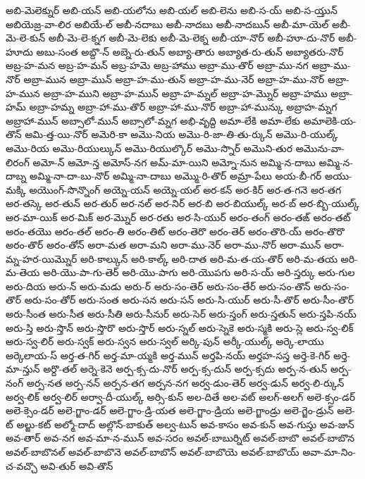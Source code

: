 {అబి-మెలెక్నుర్
అబి-యన్
అబి-యలోను
అబి-యల్
అబి-లెను
అబి-స-య్
అబి-స-య్తున్
అబియెజ్ర-వా-లిర
అబియే-ల్
అబీ-నదాబు
అబీ-నాదబు
అబీ-నాదబున్
అబీ-మా-యెల్
అబీ-మె-లె-కున్
అబీ-మె-లె-క్నగ
అబీ-మె-లెకు
అబీ-మె-లెక్న
అబీ-యా-నొర్
అబీ-హూ-దు-నొర్
అబీ-హూదు
అబు-సంత
అబ్దొ-న్
అబ్నె-రు-తున్
అబ్యా-తారు
అబ్యాత-రు-తున్
అబ్యాతరు-నొర్
అబ్ర-హ-మన
అబ్ర-హ-మన్
అబ్ర-హమె
అబ్ర-హాము
అబ్రా-ము-తొర్
అబ్రా-ము-నగ
అబ్రా-ము-నొర్
అబ్రా-మున
అబ్రా-మున్
అబ్రా-హ-ము-తున్
అబ్రా-హ-ము-నెర్
అబ్రా-హ-ము-నొర్
అబ్రా-హ-మున
అబ్రా-హ-ముని
అబ్రా-హ-మున్
అబ్రా-హ-మ్నల్
అబ్రా-హ-మ్నొర్
అబ్రా-హము
అబ్రా-హమ్
అబ్రా-హమ్న
అబ్రా-హా-ము-తొర్
అబ్రా-హా-ము-నొర్
అబ్రా-హా-మున్కు
అబ్రాహ-మ్నగ
అబ్రాహా-మున్
అబ్సాలో-మున్
అబ్సాలో-మ్నగ
అభి-వృద్ది
అమా-లేకి
అమా-లేకు
అమాలెకి-య-తొన్
అమి-త్త-యి-నొర్
అమెరి-కా
అమొ-నియ
అమొ-రి-జా-తి-తు-ర్కున్
అమొ-రి-యుల్క్
అమొ-రియ
అమొ-రియుల్కున్
అమొ-రియుల్కొర్
అమొ-స్నొర్
అమొని-తుర
అమొను-వా-లిరంగ్
అమో-న్
అమో-న్త
అమోస్-నగ
అమ్-మా-యిని
అమ్నో-నున
అమ్మి-న-దాబు
అమ్మి-న-దాబ్న
అమ్మి-నా-దా-బు-నొర్
అమ్మి-నా-దాబు
అమ్మొ-రి-తొర్
అమ్రా-పేలు
అయ-బీ-గర్
అయు-మక్కి
అయొంగ్-సొన్నొంగ్
అయ్నె-యన్
అయ్నె-యల్
అర-కన్
అర-కిర్
అర-త-గనె
అర-తగ
అర-తస్కె
అర-తున్
అర-తుర్
అర-నల్
అర-నిర్
అర-బి
అర-బియుల్క్
అర-బ్
అర-బ్బి-యుల్క్
అర-మా-యిక్
అర-మిక్
అర-మ్నొర్
అర-రతు
అర-సి-యుర్
అరం-తంగ్
అరం-తఙ్
అరం-తట్
అరం-తయొ
అరం-తల్
అరం-తి
అరం-తిట్
అరం-తెరొ
అరం-తెర్
అరం-తొరి-య్
అరం-తొరొ
అరం-తొర్
అరం-తోన్
అరా-మత
అరా-మని
అరా-ము-నెర్
అరా-ము-నొర్
అరా-మున్
అరా-మ్న-హర-యిమ్నొర్
అరి-కాల్కున్
అరి-కాల్క్
అరి-దాత
అరి-మ-త-య-తొర్
అరి-మ-తయ
అరి-మ-తెయ
అరి-యొ-పా-గు-తెర్
అరి-యొ-పాగు
అరి-యొపగు
అరి-స-య్
అరి-స్తర్కు
అరు-గుల
అరు-దియ
అరు-న్
అరు-మడు
అరు-ర్
అరు-సం-తెర్
అరు-సం-తేర్
అరు-సం-తొన్
అరు-సం-తొర్
అరు-సం-తోర్
అరు-సంత
అరు-సన
అరు-సన్
అరు-సి-యుర్
అరు-సీ-తొర్
అరు-సీం-తొర్
అరు-సీంత
అరు-సీత
అరు-సీతి
అరు-సీనుర్
అరు-సెర్
అరు-స్తంగ్
అరు-స్తతున్
అరు-స్తపి-నయ్
అరు-స్తి
అరు-స్తొన్
అరు-స్తొరొ
అరు-స్తొర్
అరు-స్నల్
అరు-స్నెకె
అరు-స్మకి
అరు-స్లె
అరు-స్వ-లిక్
అరు-స్వ-లిర్
అరు-స్వక్
అరు-స్వన
అరు-స్వల్
అర్కి-పున్
అర్కీ-యుల్క్
అర్కె-లాయు
అర్కెలాయ-స్
అర్త-త-గిర్
అర్త-మా-య్మకి
అర్త-మున్
అర్తపి-నయ్
అర్తహ-సస్త
అర్తె-కె-గిర్
అర్తె-మా-న్తున్
అర్దొ-తల్
అర్నె-కెనె
అర్ప-క్స-దు-నొర్
అర్ప-క్స-దున్
అర్ప-క్సదు
అర్ప-న-తున్
అర్ప-నంగ్
అర్ప-నత
అర్ప-నన్
అర్పన-తగ
అర్పన-నగ
అర్వ-డుం-తెర్
అర్వ-డున్
అర్వ-లి-ర్కున్
అర్వ-లిక్
అర్వ-లిర్
అర్వా-దీ-యుల్క్
అర్సి-కున్
అల-దితే
అల-వట్
అలగ్-అలగ్
అలె-క్సం-డర్
అలె-క్సెం-డర్
అలె-గ్జాం-డర్
అలె-గ్జాం-డ్రి-యత
అలె-గ్జాం-డ్రియ
అలె-గ్జాండ్రు
అలె-గ్జెం-డ్రున్
అలె-ట్
అల్జు-కట్
అల్మో-దాద్
అల్లొన్-బాకుత్
అల్వ-టున్
అవ-కాసం
అవ-కున్
అవ-గుస్తు
అవ-జున్
అవ-తార్
అవ-నగ
అవ-మా-న-మున్
అవ-సరం
అవల్-బాబుర్నిట్
అవల్-బాబొ
అవల్-బాబొన
అవల్-బాబొనల్
అవల్-బాబొనె
అవల్-బాబొన్
అవల్-బాబొయె
అవల్-బాబొయ్
అవా-మా-నిం-చ-వచ్చొ
అవి-తుర్
అవి-తొన్
}
